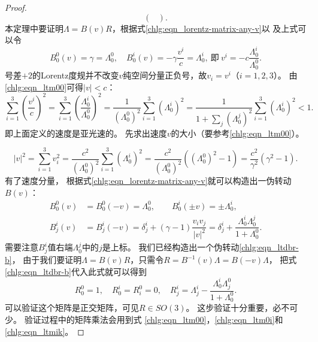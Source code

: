 \begin{proof}
\begin{equation}
\begin{pmatrix}
        \end{pmatrix} .
    \end{equation}
    本定理中要证明$\Lambda=B(v)R$，根据式\eqref{chlg:eqn_lorentz-matrix-any-v}以
    及上式可以令
    \begin{equation}
        B^{0}_{0}(v)=\gamma = \Lambda^0_{0}, \quad
        B^{i}_{0}(v)=-\gamma\frac{v^i}{c}= {\Lambda^i_{0}}, \ \text{即}\
        {v^i}= - {c}\frac{\Lambda^i_{0}}{\Lambda^0_{0}}.
    \end{equation}
    号差$+2$的Lorentz度规并不改变$v$纯空间分量正负号，故$v_i=v^i$（$i=1,2,3$）。
    由\eqref{chlg:eqn_ltm00}可得$|v|<c$：
    \begin{equation*}
        \sum_{i=1}^{3}\left( \frac{v^i}{c}\right)^2
        =\sum_{i=1}^{3}\left( \frac{\Lambda^i_{0}}{\Lambda^0_{0}}\right)^2
        =\frac{1}{(\Lambda^0_{0})^2} \sum_{i=1}^{3}\left( {\Lambda^i_{0}}\right)^2
        =\frac{1}{1+\sum_{j}\left( {\Lambda^j_{0}}\right)^2}
        \sum_{i=1}^{3}\left( {\Lambda^i_{0}}\right)^2    <1  .
    \end{equation*}
    即上面定义的速度是亚光速的。
    先求出速度$v$的大小（要参考\eqref{chlg:eqn_ltm00}）。

    \begin{equation}
        |v|^2 = \sum_{i=1}^{3}v_i^2 =  \dfrac{c^2}{(\Lambda^0_{0})^2} \sum_{i=1}^{3}
        ({\Lambda^i_{0}})^2
        = \dfrac{c^2}{(\Lambda^0_{0})^2}\left(  (\Lambda^0_{0})^2 -1\right)
        = \dfrac{c^2}{\gamma^2}\left(  \gamma^2 -1\right).
    \end{equation}
    有了速度分量，
    根据式\eqref{chlg:eqn_lorentz-matrix-any-v}就可以构造出一伪转动$B(v)$：
    \begin{equation}\label{chlg:eqn_ltdbr-b}
        \begin{aligned}
            B^{0}_{0}(v) &= B^{0}_{0}(-v) =  \Lambda ^{0}_{0}, \qquad
            B^{i}_{0}(\pm v) = \pm \Lambda ^{i}_{0}, \\
            B^{i}_{j}(v) &= B^{i}_{j}(-v) =
            \delta^i_j + (\gamma-1)\dfrac{v_i v_j}{|v|^2} =
            \delta^i_j + \dfrac{\Lambda ^{i}_{0}\Lambda ^{j}_{0}}
            {1 + \Lambda ^{0}_{0} } .
        \end{aligned}
    \end{equation}
    需要注意$B^{i}_{j}$值右端$\Lambda ^{j}_{0}$中的$j$是上标。
    我们已经构造出一个伪转动\eqref{chlg:eqn_ltdbr-b}，
    由于我们要证明$\Lambda=B(v)R$，只需令$R =B^{-1}(v)\Lambda=B(-v)\Lambda $，
    把式\eqref{chlg:eqn_ltdbr-b}代入此式就可以得到
    \begin{equation}\label{chlg:eqn_ltdbr-r}
        R^{0}_{0} = 1, \quad    R^{i}_{0} = R^{0}_{i} = 0, \quad
        R^{i}_{j} = \Lambda^i_{j} - \dfrac{\Lambda ^{i}_{0}
            \Lambda ^{0}_{j}}{1 + \Lambda ^{0}_{0} }.
    \end{equation}
    可以验证这个矩阵是正交矩阵，可见$R\in SO(3)$。
    这步验证十分重要，必不可少。
    验证过程中的矩阵乘法会用到式
    \eqref{chlg:eqn_ltm00}，\eqref{chlg:eqn_ltm0i}和\eqref{chlg:eqn_ltmik}。


\end{proof}
